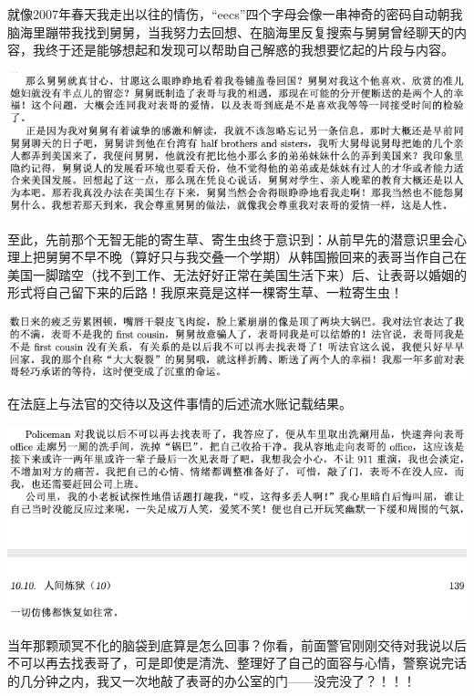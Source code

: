 \documentclass[9pt, b5paper]{article}
\begin{document}
就像2007年春天我走出以往的情伤，“eecs”四个字母会像一串神奇的密码自动朝我脑海里蹦带我找到舅舅，当我努力去回想、在脑海里反复搜索与舅舅曾经聊天的内容，我终于还是能够想起和发现可以帮助自己解惑的我想要忆起的片段与内容。

\begin{center}
\includegraphics[width=.9\linewidth]{./pic/p1p138-1.png}
\end{center}

至此，先前那个无智无能的寄生草、寄生虫终于意识到：从前早先的潜意识里会心理上把舅舅不早不晚（算好只与我交叠一个学期）从韩国搬回来的表哥当作自己在美国一脚踏空（找不到工作、无法好好正常在美国生活下来）后、让表哥以婚姻的形式将自己留下来的后路！我原来竟是这样一棵寄生草、一粒寄生虫！


\begin{center}
\includegraphics[width=.9\linewidth]{./pic/p1p138-2.png}
\end{center}

在法庭上与法官的交待以及这件事情的后述流水账记载结果。 

\begin{center}
\includegraphics[width=.9\linewidth]{./pic/p1p138-3.png}
\end{center}

当年那颗顽冥不化的脑袋到底算是怎么回事？你看，前面警官刚刚交待对我说以后不可以再去找表哥了，可是即使是清洗、整理好了自己的面容与心情，警察说完话的几分钟之内，我又一次地敲了表哥的办公室的门——没完没了？！！！
\end{document}
